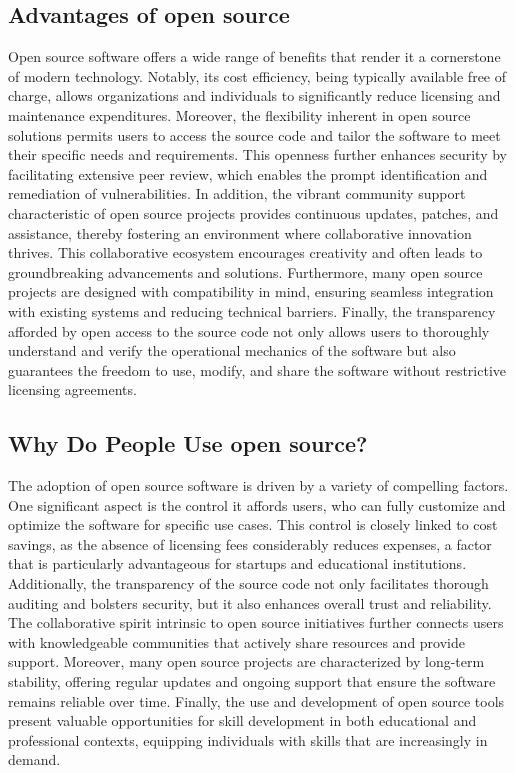 \cite{opensource_what_is}

\subsection{Advantages of open source}

Open source software offers a wide range of benefits that render it a cornerstone of modern technology. 
Notably, its cost efficiency, being typically available free of charge, allows organizations and individuals to significantly reduce licensing and maintenance expenditures. 
Moreover, the flexibility inherent in open source solutions permits users to access the source code and tailor the software to meet their specific needs and requirements. 
This openness further enhances security by facilitating extensive peer review, which enables the prompt identification and remediation of vulnerabilities. 
In addition, the vibrant community support characteristic of open source projects provides continuous updates, patches, and assistance, 
thereby fostering an environment where collaborative innovation thrives. This collaborative ecosystem encourages creativity and often leads to groundbreaking advancements 
and solutions. Furthermore, many open source projects are designed with compatibility in mind, ensuring seamless integration with existing systems and reducing technical 
barriers. Finally, the transparency afforded by open access to the source code not only allows users to thoroughly understand and verify the operational mechanics of the 
software but also guarantees the freedom to use, modify, and share the software without restrictive licensing agreements.

\cite{advantages-of-open-source-software}


\subsection{Why Do People Use open source?}

The adoption of open source software is driven by a variety of compelling factors. 
One significant aspect is the control it affords users, who can fully customize and optimize the software for specific use cases. 
This control is closely linked to cost savings, as the absence of licensing fees considerably reduces expenses, a factor that is particularly advantageous for 
startups and educational institutions. Additionally, the transparency of the source code not only facilitates thorough auditing and bolsters security, 
but it also enhances overall trust and reliability. The collaborative spirit intrinsic to open source initiatives further connects users with knowledgeable 
communities that actively share resources and provide support. Moreover, many open source projects are characterized by long-term stability, 
offering regular updates and ongoing support that ensure the software remains reliable over time. Finally, 
the use and development of open source tools present valuable opportunities for skill development in both educational and professional contexts, 
equipping individuals with skills that are increasingly in demand.


